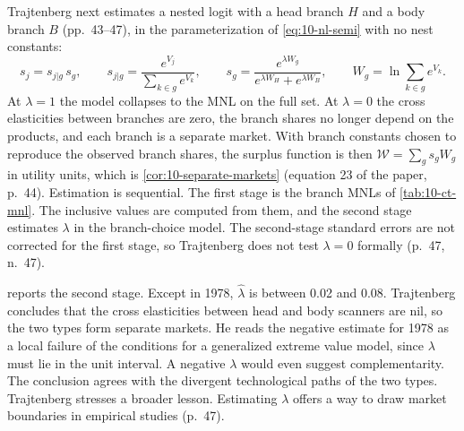  Trajtenberg next estimates a nested logit with a head branch $H$ and a body branch $B$
(pp.~43--47), in the parameterization of \eqref{eq:10-nl-semi} with no nest constants:
\begin{equation}\label{eq:10-traj-nested}
s_{j} = s_{j|g}\,s_g,
\qquad
s_{j|g} = \frac{e^{V_j}}{\sum_{k\in g}e^{V_k}},
\qquad
s_g = \frac{e^{\lambda W_g}}{e^{\lambda W_H} + e^{\lambda W_B}},
\qquad
W_g = \ln\sum_{k\in g}e^{V_k} .
\end{equation}
At $\lambda = 1$ the model collapses to the MNL on the full set. At $\lambda = 0$ the cross elasticities between
branches are zero, the branch shares no longer depend on the products, and each branch is a separate market. With
branch constants chosen to reproduce the observed branch shares, the surplus function is then
$\mathcal{W} = \sum_g s_gW_g$ in utility units, which is \cref{cor:10-separate-markets}
(equation 23 of the paper, p.~44). Estimation is sequential. The first stage is the branch MNLs of
\cref{tab:10-ct-mnl}. The inclusive values are computed from them, and the second stage estimates $\lambda$ in the
branch-choice model. The second-stage standard errors are not corrected for the first stage, so Trajtenberg does not
test $\lambda = 0$ formally (p.~47, n.~47).

 reports the second stage. Except in 1978, $\hat\lambda$ is between 0.02 and 0.08.
Trajtenberg concludes that the cross elasticities between head and body scanners are nil, so the two types form
separate markets. He reads the negative estimate for 1978 as a local failure of the conditions for a generalized
extreme value model, since $\lambda$ must lie in the unit interval. A negative $\lambda$ would even suggest
complementarity. The conclusion agrees with the divergent technological paths of the two types. Trajtenberg stresses a
broader lesson. Estimating $\lambda$ offers a way to draw market boundaries in empirical studies (p.~47).

